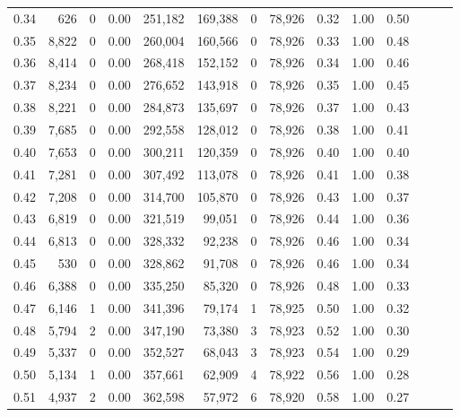 \begin{tabular}{rrrrrrrrrrrrrr}
0.34 &     626 &      0 &  0.00 &  251,182 &  169,388 &       0 &  78,926 &  0.32 &  1.00 &      0.50 \\
0.35 &   8,822 &      0 &  0.00 &  260,004 &  160,566 &       0 &  78,926 &  0.33 &  1.00 &      0.48 \\
0.36 &   8,414 &      0 &  0.00 &  268,418 &  152,152 &       0 &  78,926 &  0.34 &  1.00 &      0.46 \\
0.37 &   8,234 &      0 &  0.00 &  276,652 &  143,918 &       0 &  78,926 &  0.35 &  1.00 &      0.45 \\
0.38 &   8,221 &      0 &  0.00 &  284,873 &  135,697 &       0 &  78,926 &  0.37 &  1.00 &      0.43 \\
0.39 &   7,685 &      0 &  0.00 &  292,558 &  128,012 &       0 &  78,926 &  0.38 &  1.00 &      0.41 \\
0.40 &   7,653 &      0 &  0.00 &  300,211 &  120,359 &       0 &  78,926 &  0.40 &  1.00 &      0.40 \\
0.41 &   7,281 &      0 &  0.00 &  307,492 &  113,078 &       0 &  78,926 &  0.41 &  1.00 &      0.38 \\
0.42 &   7,208 &      0 &  0.00 &  314,700 &  105,870 &       0 &  78,926 &  0.43 &  1.00 &      0.37 \\
0.43 &   6,819 &      0 &  0.00 &  321,519 &   99,051 &       0 &  78,926 &  0.44 &  1.00 &      0.36 \\
0.44 &   6,813 &      0 &  0.00 &  328,332 &   92,238 &       0 &  78,926 &  0.46 &  1.00 &      0.34 \\
0.45 &     530 &      0 &  0.00 &  328,862 &   91,708 &       0 &  78,926 &  0.46 &  1.00 &      0.34 \\
0.46 &   6,388 &      0 &  0.00 &  335,250 &   85,320 &       0 &  78,926 &  0.48 &  1.00 &      0.33 \\
0.47 &   6,146 &      1 &  0.00 &  341,396 &   79,174 &       1 &  78,925 &  0.50 &  1.00 &      0.32 \\
0.48 &   5,794 &      2 &  0.00 &  347,190 &   73,380 &       3 &  78,923 &  0.52 &  1.00 &      0.30 \\
0.49 &   5,337 &      0 &  0.00 &  352,527 &   68,043 &       3 &  78,923 &  0.54 &  1.00 &      0.29 \\
0.50 &   5,134 &      1 &  0.00 &  357,661 &   62,909 &       4 &  78,922 &  0.56 &  1.00 &      0.28 \\
0.51 &   4,937 &      2 &  0.00 &  362,598 &   57,972 &       6 &  78,920 &  0.58 &  1.00 &      0.27 \\

\end{tabular}
